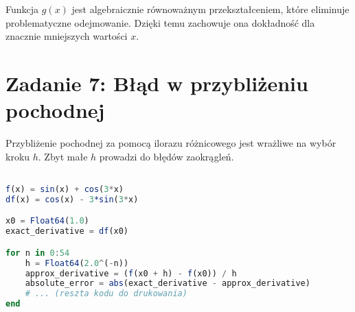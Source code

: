 \documentclass[a4paper,12pt]{article}
\begin{document}
Funkcja $g(x)$ jest algebraicznie równoważnym przekształceniem, które eliminuje problematyczne odejmowanie. Dzięki temu zachowuje ona dokładność dla znacznie mniejszych wartości $x$.
\section{Zadanie 7: Błąd w przybliżeniu pochodnej}

Przybliżenie pochodnej za pomocą ilorazu różnicowego jest wrażliwe na wybór kroku $h$. Zbyt małe $h$ prowadzi do błędów zaokrągleń.

\begin{lstlisting}[language=Julia]

f(x) = sin(x) + cos(3*x)
df(x) = cos(x) - 3*sin(3*x)

x0 = Float64(1.0)
exact_derivative = df(x0)

for n in 0:54
    h = Float64(2.0^(-n))
    approx_derivative = (f(x0 + h) - f(x0)) / h
    absolute_error = abs(exact_derivative - approx_derivative)
    # ... (reszta kodu do drukowania)
end
\end{lstlisting}
\end{document}
